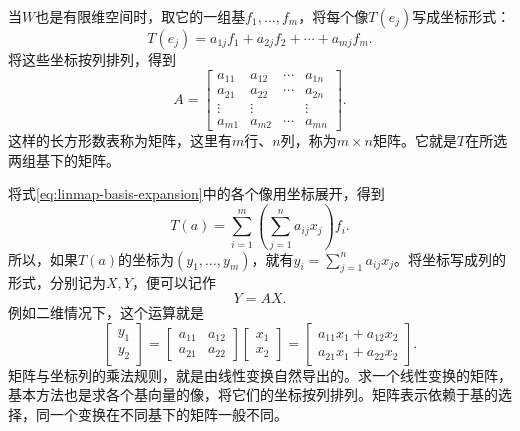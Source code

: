 当\(W\)也是有限维空间时，取它的一组基\(f_{1} , \ldots , f_{m}\)，将每个像\(T \left( e_{j} \right)\)写成坐标形式：
\begin{equation}
    T \left( e_{j} \right) = a_{1 j} f_{1} + a_{2 j} f_{2} + \cdots + a_{m j} f_{m} .
\end{equation}
将这些坐标按列排列，得到
\begin{equation}
    A = \left[ \begin{matrix}
        a_{11} & a_{12} & \cdots & a_{1 n} \\
        a_{21} & a_{22} & \cdots & a_{2 n} \\
        \vdots & \vdots & & \vdots \\
        a_{m 1} & a_{m 2} & \cdots & a_{m n}
    \end{matrix} \right] .
\end{equation}
这样的长方形数表称为{\heiti{}矩阵}，这里有\(m\)行、\(n\)列，称为\(m \times n\)矩阵。它就是\(T\)在所选两组基下的矩阵。

将式\eqref{eq:linmap-basis-expansion}中的各个像用坐标展开，得到
\begin{equation}
    T \left( a \right)
    = \sum_{i = 1}^{m} \left( \sum_{j = 1}^{n} a_{i j} x_{j} \right) f_{i} .
\end{equation}
所以，如果\(T \left( a \right)\)的坐标为\(\left( y_{1} , \ldots , y_{m} \right)\)，就有\(y_{i} = \sum_{j = 1}^{n} a_{i j} x_{j}\)。将坐标写成列的形式，分别记为\(X , Y\)，便可以记作
\begin{equation}
    Y = A X .
\end{equation}
例如二维情况下，这个运算就是
\begin{equation}
    \left[ \begin{matrix}y_{1} \\ y_{2}\end{matrix} \right]
    = \left[ \begin{matrix}a_{11} & a_{12} \\ a_{21} & a_{22}\end{matrix} \right]
      \left[ \begin{matrix}x_{1} \\ x_{2}\end{matrix} \right]
    = \left[ \begin{matrix}a_{11} x_{1} + a_{12} x_{2} \\ a_{21} x_{1} + a_{22} x_{2}\end{matrix} \right] .
\end{equation}
矩阵与坐标列的乘法规则，就是由线性变换自然导出的。求一个线性变换的矩阵，基本方法也是求各个基向量的像，将它们的坐标按列排列。矩阵表示依赖于基的选择，同一个变换在不同基下的矩阵一般不同。

